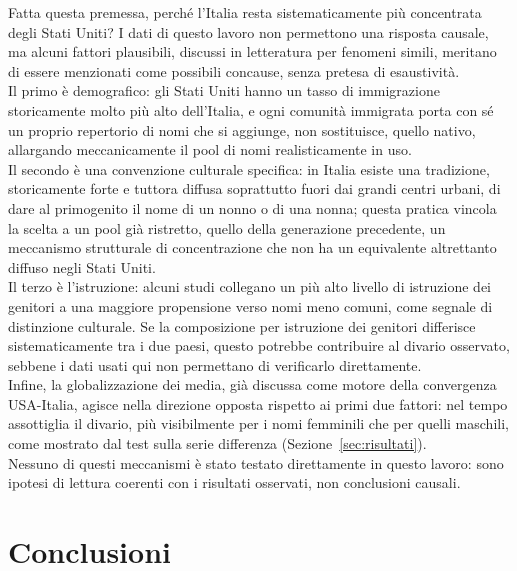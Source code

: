 \documentclass[conference]{IEEEtran}
\begin{document}
Fatta questa premessa, perché l'Italia resta sistematicamente più concentrata degli Stati Uniti? I
dati di questo lavoro non permettono una risposta causale, ma alcuni fattori plausibili, discussi in
letteratura per fenomeni simili, meritano di essere menzionati come possibili concause, senza pretesa
di esaustività. \\
Il primo è demografico: gli Stati Uniti hanno un tasso di immigrazione storicamente
molto più alto dell'Italia, e ogni comunità immigrata porta con sé un proprio repertorio di nomi che
si aggiunge, non sostituisce, quello nativo, allargando meccanicamente il pool di nomi realisticamente
in uso. \\
Il secondo è una convenzione culturale specifica: in Italia esiste una tradizione,
storicamente forte e tuttora diffusa soprattutto fuori dai grandi centri urbani, di dare al
primogenito il nome di un nonno o di una nonna; questa pratica vincola la scelta a un pool già
ristretto, quello della generazione precedente, un meccanismo strutturale di concentrazione che non ha
un equivalente altrettanto diffuso negli Stati Uniti. \\
Il terzo è l'istruzione: alcuni studi collegano
un più alto livello di istruzione dei genitori a una maggiore propensione verso nomi meno comuni, come
segnale di distinzione culturale. Se la composizione per istruzione dei genitori differisce
sistematicamente tra i due paesi, questo potrebbe contribuire al divario osservato, sebbene i dati
usati qui non permettano di verificarlo direttamente. \\
Infine, la globalizzazione dei media, già
discussa come motore della convergenza USA-Italia, agisce nella direzione opposta rispetto ai primi
due fattori: nel tempo assottiglia il divario, più visibilmente per i nomi femminili che per quelli
maschili, come mostrato dal test sulla serie differenza (Sezione~\ref{sec:risultati}). \\
Nessuno di questi meccanismi è stato testato direttamente in questo lavoro: sono ipotesi di lettura coerenti con i risultati osservati, non conclusioni causali.

\section{Conclusioni}
\end{document}
